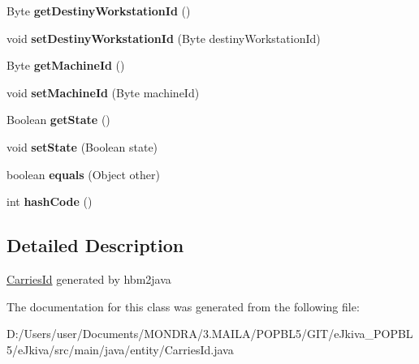 \begin{DoxyCompactItemize}
Byte {\bfseries get\+Destiny\+Workstation\+Id} ()
\item 
\mbox{\label{classentity_1_1_carries_id_af9516f9d5e88954e3e72457f2ccf4f7b}} 
void {\bfseries set\+Destiny\+Workstation\+Id} (Byte destiny\+Workstation\+Id)
\item 
\mbox{\label{classentity_1_1_carries_id_a625fe262ed6c802bc07f9f4cc4a989bb}} 
Byte {\bfseries get\+Machine\+Id} ()
\item 
\mbox{\label{classentity_1_1_carries_id_aa5bba6ca3cb097ea91354987f1b6a2f0}} 
void {\bfseries set\+Machine\+Id} (Byte machine\+Id)
\item 
\mbox{\label{classentity_1_1_carries_id_a123b2805042dd0fe551c2e766b961129}} 
Boolean {\bfseries get\+State} ()
\item 
\mbox{\label{classentity_1_1_carries_id_a8f8f0f103d2fd8db15b6416370d690e1}} 
void {\bfseries set\+State} (Boolean state)
\item 
\mbox{\label{classentity_1_1_carries_id_ac343763b0821ae53aa653fc269cb0172}} 
boolean {\bfseries equals} (Object other)
\item 
\mbox{\label{classentity_1_1_carries_id_a2d5ebee74ab620ab24e2ab3da501cfd9}} 
int {\bfseries hash\+Code} ()
\end{DoxyCompactItemize}


\subsection{Detailed Description}
\mbox{\hyperlink{classentity_1_1_carries_id}{Carries\+Id}} generated by hbm2java 

The documentation for this class was generated from the following file\+:\begin{DoxyCompactItemize}
\item 
D\+:/\+Users/user/\+Documents/\+M\+O\+N\+D\+R\+A/3.\+M\+A\+I\+L\+A/\+P\+O\+P\+B\+L5/\+G\+I\+T/e\+Jkiva\+\_\+\+P\+O\+P\+B\+L5/e\+Jkiva/src/main/java/entity/Carries\+Id.\+java\end{DoxyCompactItemize}
